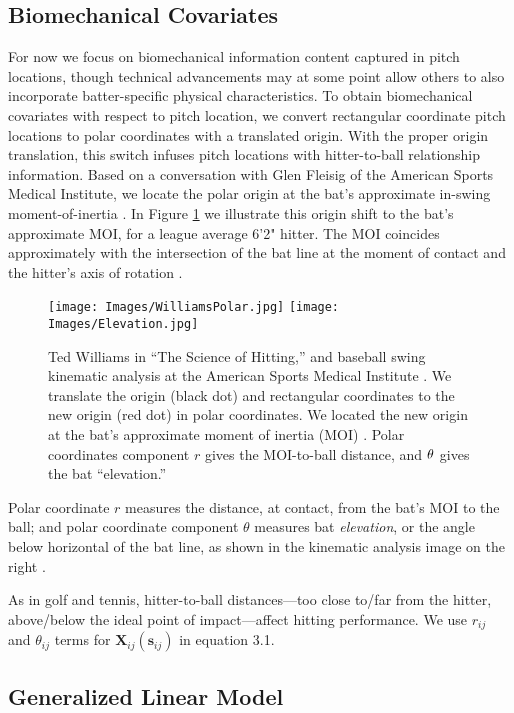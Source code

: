 \subsection{Biomechanical Covariates}

For now we focus on biomechanical information content captured in pitch locations, though technical advancements may at some point allow others to also incorporate batter-specific physical characteristics. To obtain biomechanical covariates with respect to pitch location, we convert rectangular coordinate pitch locations to polar coordinates with a translated origin. With the proper origin translation, this switch infuses pitch locations with hitter-to-ball relationship information. Based on a conversation with Glen Fleisig of the American Sports Medical Institute, we locate the polar origin at the bat's approximate in-swing moment-of-inertia \citep{Fleisig}. In Figure \ref{fig:polar} we illustrate this origin shift to the bat's approximate MOI, for a league average 6'2" hitter. The MOI coincides approximately with the intersection of the bat line at the moment of contact and the hitter's axis of rotation \citep{Welch1995}.
  \begin{figure}[H]
	\centering
	\texttt{[image: Images/WilliamsPolar.jpg]}
	\texttt{[image: Images/Elevation.jpg]}
	\caption{Ted Williams in ``The Science of Hitting,'' and baseball swing kinematic analysis at the American Sports Medical Institute \citep{Fortenbaugh2011}. We translate the origin (black dot) and rectangular coordinates to the new origin (red dot) in polar coordinates. We located the new origin at the bat's approximate moment of inertia (MOI) \citep{Fleisig}. Polar coordinates component $r$ gives the MOI-to-ball distance, and $\protect\theta$ gives the bat ``elevation.''}
	\label{fig:polar}
	\end{figure}
Polar coordinate $r$ measures the distance, at contact, from the bat's MOI to the ball; and polar coordinate component $\theta$ measures bat {\it elevation}, or the angle below horizontal of the bat line, as shown in the kinematic analysis image on the right \citep{Fortenbaugh2011}. 

As in golf and tennis, hitter-to-ball distances---too close to/far from the hitter, above/below the ideal point of impact---affect hitting performance. We use $r_{ij}$ and $\theta_{ij}$ terms for $\pmb{X}_{ij}(\pmb{s}_{ij})$ in equation 3.1.

\subsection{Generalized Linear Model} %


